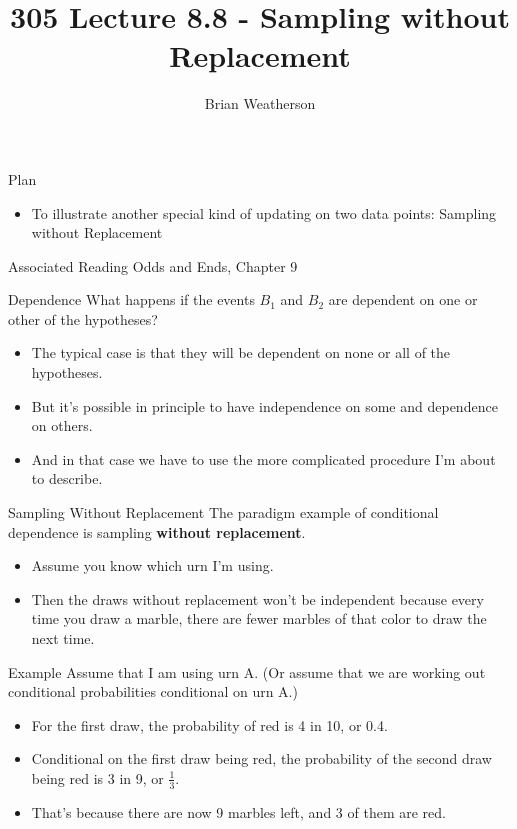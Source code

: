 \documentclass[
  ignorenonframetext,
]{beamer}
\title{305 Lecture 8.8 - Sampling without Replacement}
\author{Brian Weatherson}
\date{}
\providecommand{\tightlist}{%
  \setlength{\itemsep}{0pt}\setlength{\parskip}{0pt}}
\renewcommand{\,}{\text{, }}
\begin{document}
\frame{\titlepage}

\begin{frame}{Plan}
\protect\hypertarget{plan}{}
\begin{itemize}
\tightlist
\item
  To illustrate another special kind of updating on two data points:
  Sampling without Replacement
\end{itemize}
\end{frame}

\begin{frame}{Associated Reading}
\protect\hypertarget{associated-reading}{}
Odds and Ends, Chapter 9
\end{frame}

\begin{frame}{Dependence}
\protect\hypertarget{dependence}{}
What happens if the events \(B_1\) and \(B_2\) are dependent on one or
other of the hypotheses?

\begin{itemize}
\tightlist
\item
  The typical case is that they will be dependent on none or all of the
  hypotheses.
\item
  But it's possible in principle to have independence on some and
  dependence on others.
\item
  And in that case we have to use the more complicated procedure I'm
  about to describe.
\end{itemize}
\end{frame}

\begin{frame}{Sampling Without Replacement}
\protect\hypertarget{sampling-without-replacement}{}
The paradigm example of conditional dependence is sampling
\textbf{without replacement}.

\begin{itemize}
\tightlist
\item
  Assume you know which urn I'm using.
\item
  Then the draws without replacement won't be independent because every
  time you draw a marble, there are fewer marbles of that color to draw
  the next time.
\end{itemize}
\end{frame}

\begin{frame}{Example}
\protect\hypertarget{example}{}
Assume that I am using urn A. (Or assume that we are working out
conditional probabilities conditional on urn A.)

\begin{itemize}
\tightlist
\item
  For the first draw, the probability of red is 4 in 10, or 0.4.
\item
  Conditional on the first draw being red, the probability of the second
  draw being red is 3 in 9, or \(\frac{1}{3}\).
\item
  That's because there are now 9 marbles left, and 3 of them are red.
\end{itemize}
\end{frame}
\end{document}
